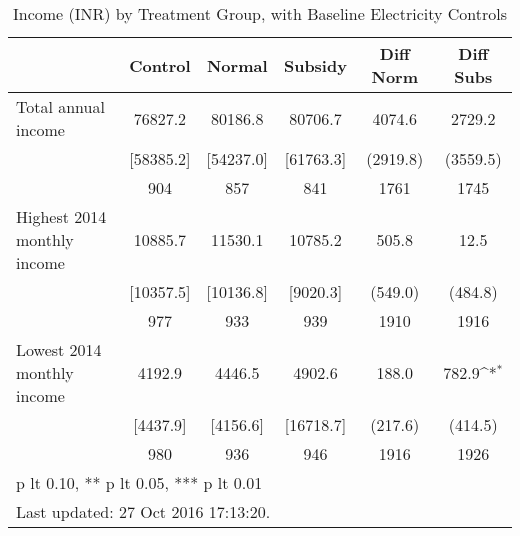 \begin{table}[htbp]\centering
\def\sym#1{\ifmmode^{#1}\else\(^{#1}\)\fi}
\caption{Income (INR) by Treatment Group, with Baseline Electricity Controls \label{tab:"balance"}}
\begin{tabular*}{0.9\hsize}{@{\hskip\tabcolsep\extracolsep\fill}l*{1}{ccccc}}
\toprule
                                &  Control&   Normal&  Subsidy&Diff Norm         &Diff Subs         \\
\midrule
Total annual income             &  76827.2&  80186.8&  80706.7&   4074.6         &   2729.2         \\
                                &[58385.2]&[54237.0]&[61763.3]& (2919.8)         & (3559.5)         \\
                                &      904&      857&      841&     1761         &     1745         \\
Highest 2014 monthly income     &  10885.7&  11530.1&  10785.2&    505.8         &     12.5         \\
                                &[10357.5]&[10136.8]& [9020.3]&  (549.0)         &  (484.8)         \\
                                &      977&      933&      939&     1910         &     1916         \\
Lowest 2014 monthly income      &   4192.9&   4446.5&   4902.6&    188.0         &    782.9\sym{*}  \\
                                & [4437.9]& [4156.6]&[16718.7]&  (217.6)         &  (414.5)         \\
                                &      980&      936&      946&     1916         &     1926         \\
\bottomrule
\multicolumn{6}{l}{\footnotesize * p lt 0.10, ** p lt 0.05, *** p lt 0.01}\\
\multicolumn{6}{l}{\footnotesize Last updated: 27 Oct 2016 17:13:20.}\\
\end{tabular*}
\end{table}
